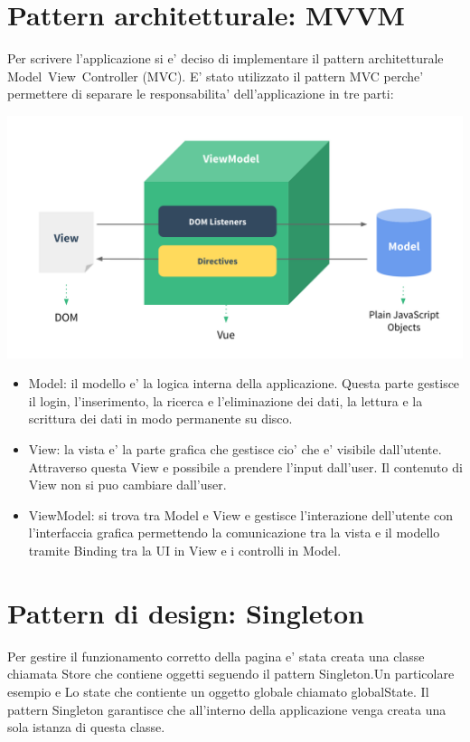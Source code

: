 \documentclass[ 4paper,11pt,openany]{book}
\begin{document}
\section{Pattern architetturale: MVVM}
Per scrivere l'applicazione si e' deciso di implementare il pattern architetturale Model~View~Controller (MVC).
E' stato utilizzato il pattern MVC perche' permettere di separare le responsabilita' dell'applicazione in tre parti:
\begin{center}
	\includegraphics[width=170mm]{Vuemvvm.png}
\end{center}
\begin{itemize}
	\item Model: il modello e' la logica interna della applicazione. Questa parte gestisce il login, l'inserimento, la ricerca e l'eliminazione dei dati, la lettura e la scrittura dei dati in modo permanente su disco.
	\item View: la vista e' la parte grafica che gestisce cio' che e' visibile dall'utente. Attraverso questa View e possibile a prendere l'input dall'user. Il contenuto di View non si puo cambiare dall'user.
	\item ViewModel: si trova tra Model e View e gestisce l'interazione dell'utente con l'interfaccia grafica permettendo la comunicazione tra la vista e il modello tramite Binding tra la UI in View e i controlli in Model.
\end{itemize}

	
\section{Pattern di design: Singleton}
Per gestire il funzionamento corretto della pagina e' stata creata una classe chiamata Store che contiene oggetti seguendo il pattern Singleton.Un particolare esempio e Lo state che contiente un oggetto globale chiamato globalState.
Il pattern Singleton garantisce che all'interno della applicazione venga creata una sola istanza di questa classe.
	
\end{document}
